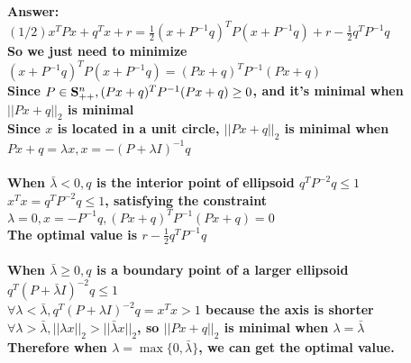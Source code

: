 \documentclass{article}
\newcommand{\symm}{{\bf{S}}}
\theoremstyle{definition}
\theoremstyle{definition}
\theoremstyle{remark}
\begin{document}
{\bf{Answer:
\\$(1/2)x^TPx+q^Tx+r=\frac{1}{2}(x+P^{-1}q)^TP(x+P^{-1}q)+r-\frac{1}{2}q^TP^{-1}q$
\\So we just need to minimize $(x+P^{-1}q)^TP(x+P^{-1}q)=(Px+q)^TP^{-1}(Px+q)$
\\Since $P\in\symm^n_{++},(Px+q)^TP^{-1}(Px+q)\geq0$, and it's minimal when $||Px+q||_2$ is minimal 
\\Since $x$ is located in a unit circle, $||Px+q||_2$ is minimal when $Px+q=\lambda x,x=-(P+\lambda I)^{-1}q$
\\\\When $\bar{\lambda}<0,q$ is the interior point of ellipsoid $q^TP^{-2}q\leq1$
\\$x^Tx=q^TP^{-2}q\leq1$, satisfying the constraint 
\\$\lambda=0,x=-P^{-1}q,(Px+q)^TP^{-1}(Px+q)=0$
\\The optimal value is $r-\frac{1}{2}q^TP^{-1}q$
\\\\When $\bar{\lambda}\geq0,q$ is a boundary point of a larger ellipsoid $q^T(P+\bar{\lambda}I)^{-2}q\leq1$ 
\\$\forall \lambda<\bar{\lambda},q^T(P+\lambda I)^{-2}q=x^Tx>1$ because the axis is shorter
\\$\forall \lambda>\bar{\lambda},||\lambda x||_2>||\bar{\lambda} x||_2$, so $||Px+q||_2$ is minimal when $\lambda=\bar{\lambda}$
\\Therefore when $\lambda=\max\{0,\bar{\lambda}\}$, we can get the optimal value.
}}

\end{document}
